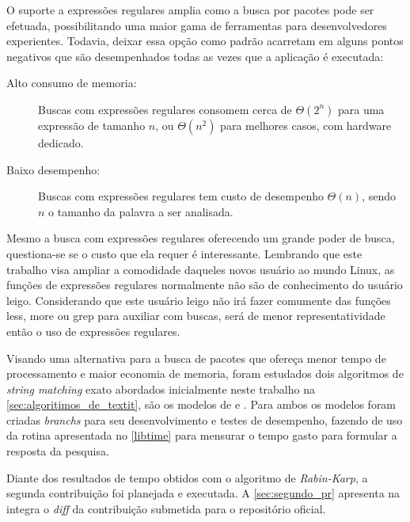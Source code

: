 O suporte a expressões regulares amplia como a busca por pacotes pode ser efetuada, possibilitando uma maior gama de ferramentas para desenvolvedores experientes. Todavia, deixar essa opção como padrão acarretam em alguns pontos negativos que são desempenhados todas as vezes que a aplicação é executada:

\begin{description}
	\item [Alto consumo de memoria:] Buscas com expressões regulares consomem cerca de $\Theta(2^n)$ para uma expressão de tamanho $n$, ou $\Theta(n^2)$ para melhores casos, com hardware dedicado\cite{sidhu2001fast}.
	\item [Baixo desempenho:] Buscas com expressões regulares tem custo de desempenho $\Theta(n)$, sendo $n$ o tamanho da palavra a ser analisada.
\end{description}

Mesmo a busca com expressões regulares oferecendo um grande poder de busca, questiona-se se o custo que ela requer é interessante. Lembrando que este trabalho visa ampliar a comodidade daqueles novos usuário ao mundo Linux, as funções de expressões regulares normalmente não são de conhecimento do usuário leigo. Considerando que este usuário leigo não irá fazer comumente das funções {\code less}, {\code more} ou {\code grep} para auxiliar com buscas, será de menor representatividade então o uso de expressões regulares.



Visando uma alternativa para a busca de pacotes que ofereça menor tempo de processamento e maior economia de memoria, foram estudados dois algoritmos de \textit{string matching} exato abordados inicialmente neste trabalho na \autoref{sec:algoritimos_de_textit}, são os modelos de  e . Para ambos os modelos foram criadas \textit{branchs} para seu desenvolvimento e testes de desempenho, fazendo de uso da rotina apresentada no \autoref{libtime} para mensurar o tempo gasto para formular a resposta da pesquisa. 

Diante dos resultados de tempo obtidos com o algoritmo de \textit{Rabin-Karp}, a segunda contribuição foi planejada e executada. A \autoref{sec:segundo_pr} apresenta na integra o \textit{diff} da contribuição submetida para o repositório oficial.


